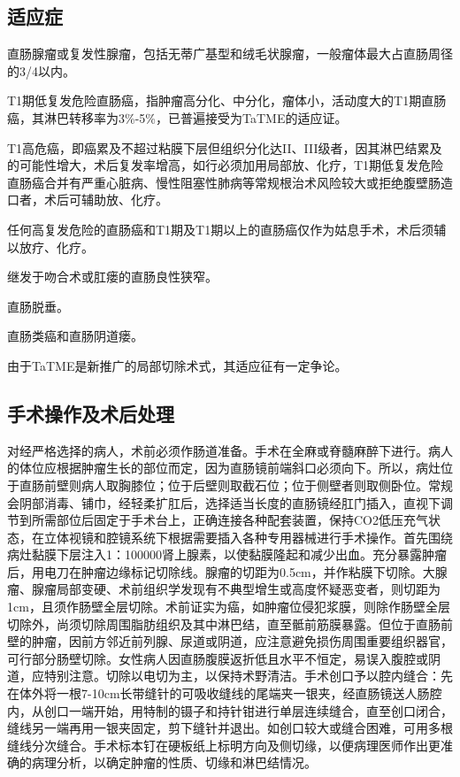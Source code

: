 \documentclass[a4paper,11pt,onecolumn,twoside]{article}
\begin{document}
\begin{multicols}{2}
    \subsection{适应症}
    \begin{compactenum}
        \item 直肠腺瘤或复发性腺瘤，包括无蒂广基型和绒毛状腺瘤，一般瘤体最大占直肠周径的3/4以内\supercite{9,10}。
        \item T1期低复发危险直肠癌，指肿瘤高分化、中分化，瘤体小，活动度大的T1期直肠癌，其淋巴转移率为3\%-5\%，已普遍接受为TaTME的适应证。
        \item T1高危癌，即癌累及不超过粘膜下层但组织分化达II、III级者，因其淋巴结累及的可能性增大，术后复发率增高，如行必须加用局部放、化疗，T1期低复发危险直肠癌合并有严重心脏病、慢性阻塞性肺病等常规根治术风险较大或拒绝腹壁肠造口者，术后可辅助放、化疗\supercite{11}。
        \item 任何高复发危险的直肠癌和T1期及T1期以上的直肠癌仅作为姑息手术，术后须辅以放疗、化疗。
        \item 继发于吻合术或肛瘘的直肠良性狭窄。
        \item 直肠脱垂。
        \item 直肠类癌和直肠阴道瘘。
    \end{compactenum}

    由于TaTME是新推广的局部切除术式，其适应征有一定争论。

    \subsection{手术操作及术后处理}
    对经严格选择的病人，术前必须作肠道准备。手术在全麻或脊髓麻醉下进行。病人的体位应根据肿瘤生长的部位而定，因为直肠镜前端斜口必须向下。所以，病灶位于直肠前壁则病人取胸膝位；位于后壁则取截石位；位于侧壁者则取侧卧位。常规会阴部消毒、铺巾，经轻柔扩肛后，选择适当长度的直肠镜经肛门插入，直视下调节到所需部位后固定于手术台上，正确连接各种配套装置，保持CO2低压充气状态，在立体视镜和腔镜系统下根据需要插入各种专用器械进行手术操作。首先围绕病灶黏膜下层注入1：100000肾上腺素，以使黏膜隆起和减少出血。充分暴露肿瘤后，用电刀在肿瘤边缘标记切除线。腺瘤的切距为0.5cm，并作粘膜下切除。大腺瘤、腺瘤局部变硬、术前组织学发现有不典型增生或高度怀疑恶变者，则切距为1cm，且须作肠壁全层切除。术前证实为癌，如肿瘤位侵犯浆膜，则除作肠壁全层切除外，尚须切除周围脂肪组织及其中淋巴结，直至骶前筋膜暴露。但位于直肠前壁的肿瘤，因前方邻近前列腺、尿道或阴道，应注意避免损伤周围重要组织器官，可行部分肠壁切除。女性病人因直肠腹膜返折低且水平不恒定，易误入腹腔或阴道，应特别注意。切除以电切为主，以保持术野清洁。手术创口予以腔内缝合：先在体外将一根7-10cm长带缝针的可吸收缝线的尾端夹一银夹，经直肠镜送人肠腔内，从创口一端开始，用特制的镊子和持针钳进行单层连续缝合，直至创口闭合，缝线另一端再用一银夹固定，剪下缝针并退出。如创口较大或缝合困难，可用多根缝线分次缝合。手术标本钉在硬板纸上标明方向及侧切缘，以便病理医师作出更准确的病理分析，以确定肿瘤的性质、切缘和淋巴结情况\supercite{12}。


\end{multicols}
\end{document}
